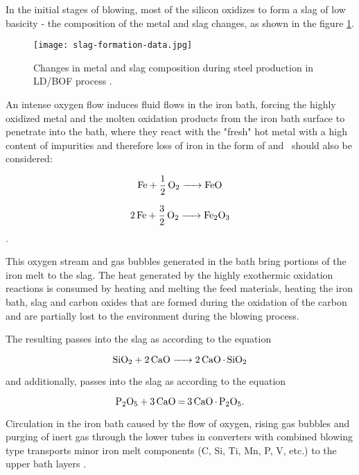 In the initial stages of blowing, most of the silicon oxidizes to form a slag of low basicity - the composition of the metal and slag changes, as shown in the figure \ref{o:20}.

\begin{figure}[h!]
	\centering
	\texttt{[image: slag-formation-data.jpg]}
	\caption{Changes in metal and slag composition during steel production in LD/BOF process \citep{Turkdogan1996}.}
	\label{o:20}
\end{figure}

An intense oxygen flow induces fluid flows in the iron bath, forcing the highly oxidized metal and the molten oxidation products from the iron bath surface to penetrate into the bath, where they react with the "fresh" hot metal with a high content of impurities and therefore loss of iron in the form of  and~ should also be considered:

\begin{equation}
\ce{Fe + 1/2O2 -> FeO}
\end{equation}

\begin{equation}
\ce{2Fe + 3/2O2 -> Fe2O3}
\end{equation}.

This oxygen stream and gas bubbles generated in the bath bring portions of the iron melt to the slag. The heat generated by the highly exothermic oxidation reactions is consumed by heating and melting the feed materials, heating the iron bath, slag and carbon oxides that are formed during the oxidation of the carbon and are partially lost to the environment during the blowing process.

The resulting  passes into the slag as  according to the equation

\begin{equation}
\ce{SiO2 + 2CaO -> 2CaO.SiO2}
\end{equation}

and additionally,  passes into the slag as  according to the equation \cite{sprava2017}

\begin{equation}
\ce{P2O5 + 3CaO = 3CaO.P2O5}.
\end{equation}

Circulation in the iron bath caused by the flow of oxygen, rising gas bubbles and purging of inert gas through the lower tubes in converters with combined blowing type transports minor iron melt components (C, Si, Ti, Mn, P, V, etc.) to the upper bath layers \cite{Jalkanen2006}. 

